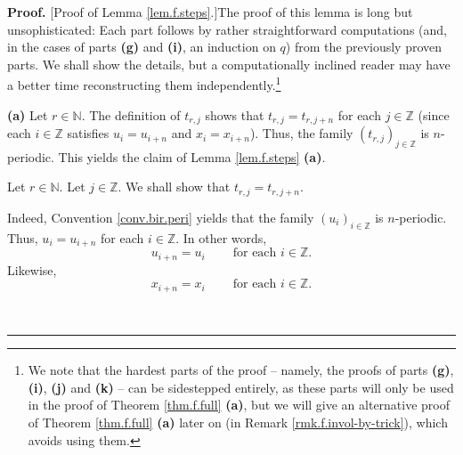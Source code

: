 \documentclass[numbers=enddot,12pt,final,onecolumn,notitlepage]{scrartcl}%
\theoremstyle{definition}
\newenvironment{proof}[1][Proof]{\noindent\textbf{#1.} }{\ \rule{0.5em}{0.5em}}
\newenvironment{verlong}{}{}
\newenvironment{vershort}{}{}
\begin{document}
\begin{proof}
[Proof of Lemma \ref{lem.f.steps}.]The proof of this lemma is long but
unsophisticated: Each part follows by rather straightforward computations
(and, in the cases of parts \textbf{(g)} and \textbf{(i)}, an induction on
$q$) from the previously proven parts. We shall show the details, but a
computationally inclined reader may have a better time reconstructing them
independently.\footnote{We note that the hardest parts of the proof -- namely,
the proofs of parts \textbf{(g)}, \textbf{(i)}, \textbf{(j)} and \textbf{(k)}
-- can be sidestepped entirely, as these parts will only be used in the proof
of Theorem \ref{thm.f.full} \textbf{(a)}, but we will give an alternative
proof of Theorem \ref{thm.f.full} \textbf{(a)} later on (in Remark
\ref{rmk.f.invol-by-trick}), which avoids using them.}

\begin{vershort}
\textbf{(a)} Let $r\in\mathbb{N}$. The definition of $t_{r,j}$ shows that
$t_{r,j}=t_{r,j+n}$ for each $j\in\mathbb{Z}$ (since each $i\in\mathbb{Z}$
satisfies $u_{i}=u_{i+n}$ and $x_{i}=x_{i+n}$). Thus, the family $\left(
t_{r,j}\right)  _{j\in\mathbb{Z}}$ is $n$-periodic. This yields the claim of
Lemma \ref{lem.f.steps} \textbf{(a)}.
\end{vershort}

\begin{verlong}
Let $r\in\mathbb{N}$. Let $j\in\mathbb{Z}$. We shall show that $t_{r,j}%
=t_{r,j+n}$.

Indeed, Convention \ref{conv.bir.peri} yields that the family $\left(
u_{i}\right)  _{i\in\mathbb{Z}}$ is $n$-periodic. Thus, $u_{i}=u_{i+n}$ for
each $i\in\mathbb{Z}$. In other words,%
\begin{equation}
u_{i+n}=u_{i}\ \ \ \ \ \ \ \ \ \ \text{for each }i\in\mathbb{Z}.
\label{pf.lem.f.steps.a.uper}%
\end{equation}
Likewise,
\begin{equation}
x_{i+n}=x_{i}\ \ \ \ \ \ \ \ \ \ \text{for each }i\in\mathbb{Z}.
\label{pf.lem.f.steps.a.xper}%
\end{equation}



\end{verlong}
\end{proof}
\end{document}
